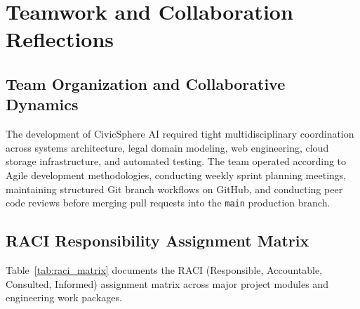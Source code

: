 \chapter{Teamwork and Collaboration Reflections}
\label{ch:teamwork_reflections}

\section{Team Organization and Collaborative Dynamics}
\label{sec:team_dynamics}
The development of CivicSphere AI required tight multidisciplinary coordination across systems architecture, legal domain modeling, web engineering, cloud storage infrastructure, and automated testing. The team operated according to Agile development methodologies, conducting weekly sprint planning meetings, maintaining structured Git branch workflows on GitHub, and conducting peer code reviews before merging pull requests into the \texttt{main} production branch.

\section{RACI Responsibility Assignment Matrix}
\label{sec:raci_matrix}
Table~\ref{tab:raci_matrix} documents the RACI (Responsible, Accountable, Consulted, Informed) assignment matrix across major project modules and engineering work packages.

\begin{table}[H]
\centering
\caption{RACI Responsibility Assignment Matrix for CivicSphere AI}
\label{tab:raci_matrix}
\end{table}

